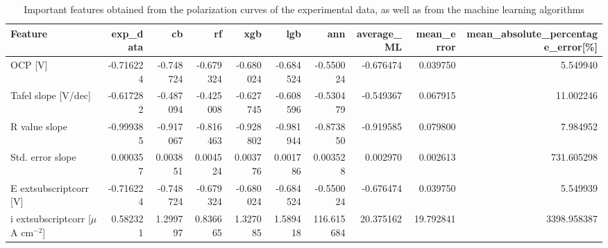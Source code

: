 \begin{table}[H]
\centering
\caption{Important features obtained from the polarization curves of the experimental data, as well as from the machine learning algorithms}
\label{imp_feat_ph_4.2}
\begin{tabular}{lrrrrrrrrr}
\toprule
Feature & exp_data & cb & rf & xgb & lgb & ann & average_ML & mean_error & mean_absolute_percentage_error[\%] \\
\midrule
OCP [V] & -0.716224 & -0.748724 & -0.679324 & -0.680024 & -0.684524 & -0.550024 & -0.676474 & 0.039750 & 5.549940 \\
Tafel slope [V/dec] & -0.617282 & -0.487094 & -0.425008 & -0.627745 & -0.608596 & -0.530479 & -0.549367 & 0.067915 & 11.002246 \\
R value slope & -0.999385 & -0.917067 & -0.816463 & -0.928802 & -0.981944 & -0.873850 & -0.919585 & 0.079800 & 7.984952 \\
Std. error slope & 0.000357 & 0.003851 & 0.004524 & 0.003776 & 0.001786 & 0.003528 & 0.002970 & 0.002613 & 731.605298 \\
E	extsubscript{corr} [V] & -0.716224 & -0.748724 & -0.679324 & -0.680024 & -0.684524 & -0.550024 & -0.676474 & 0.039750 & 5.549939 \\
i	extsubscript{corr} [$\mu$A cm$^{-2}$] & 0.582321 & 1.299797 & 0.836665 & 1.327085 & 1.589418 & 116.615684 & 20.375162 & 19.792841 & 3398.958387 \\
\bottomrule
\end{tabular}
\end{table}
